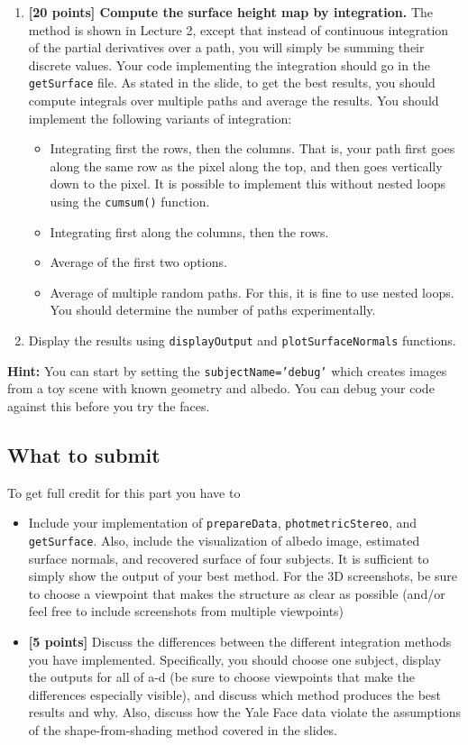 \documentclass[10pt,letterpaper]{article}
\newcommand{\cmd}[1] {{\color{blue}\texttt{#1}}}
\begin{document}
\begin{enumerate}
\item \textbf{[20 points] Compute the surface height map by integration.} The method is shown in Lecture 2, except that instead of continuous integration of the partial derivatives over a path, you will simply be summing their discrete values. Your code implementing the integration should go in the \cmd{getSurface} file. As stated in the slide, to get the best results, you should compute integrals over multiple paths and average the results. You should implement the following variants of integration: 
\begin{itemize}
\item Integrating first the rows, then the columns. That is, your path first goes along the same row as the pixel along the top, and then goes vertically down to the pixel. It is possible to implement this without nested loops using the \cmd{cumsum()} function.
\item Integrating first along the columns, then the rows.
\item Average of the first two options.
\item Average of multiple random paths. For this, it is fine to use nested loops. You should determine the number of paths experimentally.
\end{itemize}

\item Display the results using \cmd{displayOutput} and \cmd{plotSurfaceNormals} functions.

\end{enumerate}

\textbf{Hint:} You can start by setting the \cmd{subjectName='debug'} which creates images from a toy scene with known geometry and albedo. You can debug your code against this before you try the faces.

\subsection{What to submit}
To get full credit for this part you have to
\begin{itemize}
\item Include your implementation of \cmd{prepareData}, \cmd{photmetricStereo}, and \cmd{getSurface}. Also, include the visualization of albedo image, estimated surface normals, and recovered surface of four subjects. It is sufficient to simply show the output of your best method. For the 3D screenshots, be sure to choose a viewpoint that makes the structure as clear as possible (and/or feel free to include screenshots from multiple viewpoints)
\item \textbf{[5 points]} Discuss the differences between the different integration methods you have implemented. Specifically, you should choose one subject, display the outputs for all of a-d (be sure to choose viewpoints that make the differences especially visible), and discuss which method produces the best results and why. Also, discuss how the Yale Face data violate the assumptions of the shape-from-shading method covered in the slides.
\end{itemize}
\end{document}
